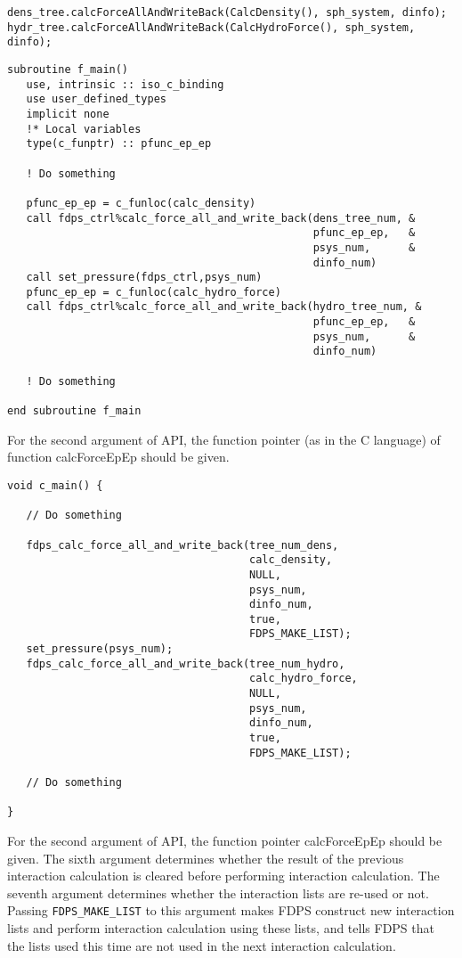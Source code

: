 \ifCpp %
\begin{lstlisting}[caption=Interaction Calculation]
dens_tree.calcForceAllAndWriteBack(CalcDensity(), sph_system, dinfo);
hydr_tree.calcForceAllAndWriteBack(CalcHydroForce(), sph_system, dinfo);
\end{lstlisting}
\endifCpp
\ifFtn %
\begin{lstlisting}[caption=Interaction Calculation]
subroutine f_main()
   use, intrinsic :: iso_c_binding
   use user_defined_types
   implicit none
   !* Local variables
   type(c_funptr) :: pfunc_ep_ep
   
   ! Do something
   
   pfunc_ep_ep = c_funloc(calc_density)
   call fdps_ctrl%calc_force_all_and_write_back(dens_tree_num, &
                                                pfunc_ep_ep,   &
                                                psys_num,      &
                                                dinfo_num)
   call set_pressure(fdps_ctrl,psys_num)
   pfunc_ep_ep = c_funloc(calc_hydro_force)
   call fdps_ctrl%calc_force_all_and_write_back(hydro_tree_num, &
                                                pfunc_ep_ep,   &
                                                psys_num,      &
                                                dinfo_num)

   ! Do something

end subroutine f_main
\end{lstlisting}
For the second argument of API, the function pointer (as in the C
language) of function \textsf{calcForceEpEp} should be given.
\endifFtn
\ifC %
\begin{lstlisting}[caption=Interaction Calculation]
void c_main() {
   
   // Do something
   
   fdps_calc_force_all_and_write_back(tree_num_dens,
                                      calc_density,
                                      NULL,
                                      psys_num,
                                      dinfo_num,
                                      true,
                                      FDPS_MAKE_LIST);
   set_pressure(psys_num);
   fdps_calc_force_all_and_write_back(tree_num_hydro,
                                      calc_hydro_force,
                                      NULL,
                                      psys_num,
                                      dinfo_num,
                                      true,
                                      FDPS_MAKE_LIST);

   // Do something

}
\end{lstlisting}
For the second argument of API, the function pointer \textsf{calcForceEpEp} should be given. The sixth argument determines whether the result of the previous interaction calculation is cleared before performing interaction calculation. The seventh argument determines whether the interaction lists are re-used or not. Passing \texttt{FDPS\_MAKE\_LIST} to this argument makes FDPS construct new interaction lists and perform interaction calculation using these lists, and tells FDPS that the lists used this time are not used in the next interaction calculation.
\endifC

